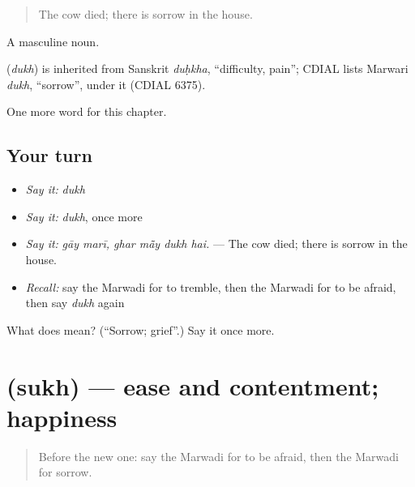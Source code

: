 \begin{quote}
The cow died; there is sorrow in the house.
\end{quote}

A masculine noun.

\begin{cousinweb}
\textbf{} (\emph{dukh}) is inherited from Sanskrit \emph{duḥkha}, \textquotedblleft{}difficulty, pain\textquotedblright{}; CDIAL lists Marwari \emph{dukh}, \textquotedblleft{}sorrow\textquotedblright{}, under it (CDIAL 6375).
\end{cousinweb}

\begin{grammarlens}[title={What you've built}]
One more word for this chapter.
\end{grammarlens}

\subsection*{Your turn}
\begin{itemize}
\raggedright
  \item \emph{Say it:} \emph{dukh}
  \item \emph{Say it:} \emph{dukh}, once more
  \item \emph{Say it:} \emph{gāy marī, ghar mā̃y dukh hai.} — The cow died; there is sorrow in the house.
  \item \emph{Recall:} say the Marwadi for to tremble, then the Marwadi for to be afraid, then say \emph{dukh} again
\end{itemize}

\begin{tcolorbox}[breakable,colback=teal!4,colframe=teal!35!black,title={Before you move on}]
What does  mean? (\textquotedblleft{}Sorrow; grief\textquotedblright{}.) Say it once more.
\end{tcolorbox}
\section[\texorpdfstring{\mw{सुख} (sukh)}{सुख (sukh)}]{ (sukh) — ease and contentment; happiness}

\label{lesson:MW-C256-sukh}



\begin{quote}
Before the new one: say the Marwadi for to be afraid, then the Marwadi for sorrow.
\end{quote}

